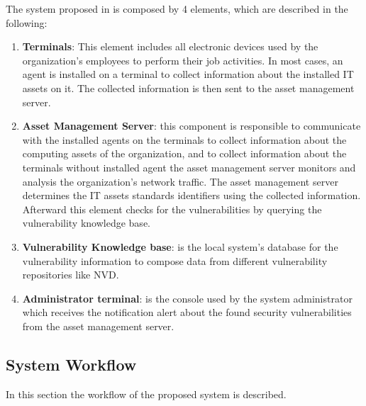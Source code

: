\documentclass{llncs}
\begin{document}
\par The system proposed in \cite{paper1} is composed by 4 elements, which are described in the following:


 \begin{enumerate}
 \item \textbf{Terminals}: This element includes all electronic devices used by the organization's employees to perform their job activities. In most cases, an agent is installed on a terminal to collect information about the installed IT assets on it. The collected information is then sent to the asset management server.
 
 \item \textbf{Asset Management Server}: this component is responsible to communicate with the installed agents on the terminals to collect information about the computing assets of the organization, and to collect information about the terminals without installed agent the asset management server monitors and analysis the organization's network traffic. The asset management server determines the IT assets standards identifiers using the collected information. Afterward this element checks for the vulnerabilities by querying the vulnerability knowledge base.
 
 \item \textbf{Vulnerability Knowledge base}: is the local system's database for the vulnerability information to compose data from different vulnerability repositories like NVD.
 
 
  \item \textbf{Administrator terminal}: is the console used by the system administrator which receives the notification alert about the found  security vulnerabilities from the asset management server.     
 \end{enumerate}
 
 \newpage
\subsection{System Workflow}

\par In this section the workflow of the proposed system is described.
 
\end{document}
